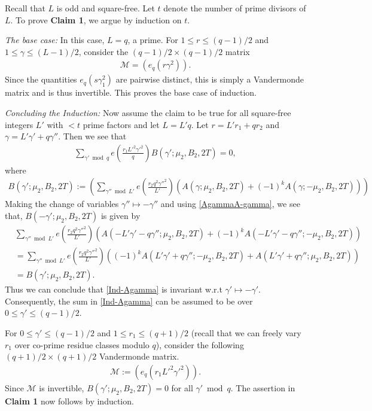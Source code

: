 \documentclass[11pt]{amsart}
\numberwithin{equation}{section}
\newcommand{\mc}{\mathcal}
\begin{document}
Recall that $L$ is odd and square-free. Let $t$ denote the number of prime divisors of $L$. To prove \textbf{Claim 1}, we argue by induction on $t$.

\textit{The base case:} In this case, $L=q$, a prime. For $1\le r\le (q-1)/2$ and $1\le \gamma\le (L-1)/2$, consider the $(q-1)/2\times (q-1)/2$ matrix
\begin{align}
    \mc M = \left(e_{q}\left(r\gamma^2 \right) \right).
\end{align}
Since the quantities  $e_{q}\left(s\gamma_1^2 \right)$ are pairwise distinct, this is simply a Vandermonde matrix and is thus invertible. This proves the base case of induction. 

\textit{Concluding the Induction:} Now assume the claim to be true for all square-free integers $L'$ with $<t$ prime factors and let $L=L'q$. Let $r=L'r_1+qr_2$ and $\gamma=L'\gamma'+q\gamma''$. Then we see that
\begin{align}\label{Ind-Agamma}
    \sum_{\gamma' \bmod q}e\left(\frac{r_1L'^2\gamma'^2}{q} \right)B(\gamma'; \mu_2, B_2, 2T)=0,
\end{align}
where
\begin{align}
    B(\gamma'; \mu_2, B_2, 2T):=\left( \sum_{\gamma'' \bmod L'}e\left(\frac{r_2q^2\gamma''^2}{L'} \right)\left(A(\gamma; \mu_2, B_2, 2T)+(-1)^kA(\gamma; -\mu_2, B_2, 2T) \right)\right)
\end{align}
Making the change of variables $\gamma''\mapsto -\gamma''$ and using \eqref{AgammaA-gamma}, we see that, $B(-\gamma'; \mu_2, B_2, 2T)$ is given by
\begin{align}
&\sum_{\gamma'' \bmod L'}e\left(\frac{r_2q^2\gamma''^2}{L'} \right)\left(A(-L'\gamma'-q\gamma''; \mu_2, B_2, 2T)+(-1)^kA(-L'\gamma'-q\gamma''; -\mu_2, B_2, 2T) \right)\\
&= \sum_{\gamma'' \bmod L'}e\left(\frac{r_2q^2\gamma''^2}{L'} \right)\left((-1)^kA(L'\gamma'+q\gamma''; -\mu_2, B_2, 2T)+A(L'\gamma'+q\gamma''; \mu_2, B_2, 2T) \right)\\
&=B(\gamma'; \mu_2, B_2, 2T).
\end{align}
Thus we can conclude that \eqref{Ind-Agamma} is invariant w.r.t $\gamma'\mapsto -\gamma'$. Consequently, the sum in \eqref{Ind-Agamma} can be assumed to be over $0\le \gamma'\le (q-1)/2$.

For $0\le \gamma'\le (q-1)/2$ and $1\le r_1\le (q+1)/2$ (recall that we can freely vary $r_1$ over co-prime residue classes modulo $q$), 
consider the following $(q+1)/2\times (q+1)/2$ Vandermonde matrix.
\begin{align}
    \mc M := \left(e_{q}\left(r_1L'^2\gamma'^2 \right) \right).
\end{align}
Since $\mc M$ is invertible, $B(\gamma'; \mu_2, B_2, 2T)=0$ for all $\gamma'\bmod q$. The assertion in \textbf{Claim 1} now follows by induction.
\end{document}
